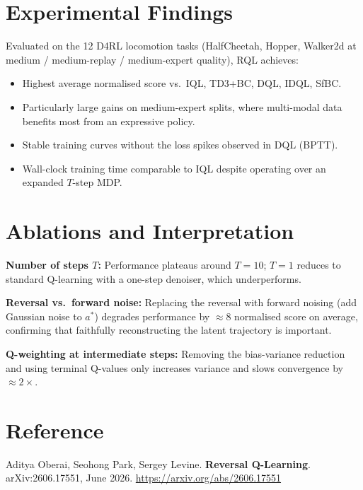 \documentclass[10pt,twocolumn]{article}
\begin{document}
\section{Experimental Findings}

Evaluated on the 12 D4RL locomotion tasks (HalfCheetah, Hopper, Walker2d at
medium / medium-replay / medium-expert quality), RQL achieves:
\begin{itemize}[itemsep=2pt,parsep=0pt]
  \item Highest average normalised score vs.\ IQL, TD3+BC, DQL, IDQL, SfBC.
  \item Particularly large gains on medium-expert splits, where multi-modal
    data benefits most from an expressive policy.
  \item Stable training curves without the loss spikes observed in DQL (BPTT).
  \item Wall-clock training time comparable to IQL despite operating over an
    expanded $T$-step MDP.
\end{itemize}

\section{Ablations and Interpretation}

\textbf{Number of steps $T$:} Performance plateaus around $T=10$; $T=1$
reduces to standard Q-learning with a one-step denoiser, which underperforms.

\textbf{Reversal vs.\ forward noise:} Replacing the reversal with forward
noising (add Gaussian noise to $a^*$) degrades performance by $\approx8$
normalised score on average, confirming that faithfully reconstructing the
latent trajectory is important.

\textbf{Q-weighting at intermediate steps:} Removing the bias-variance
reduction and using terminal Q-values only increases variance and slows
convergence by $\approx2\times$.

\section*{Reference}

Aditya Oberai, Seohong Park, Sergey Levine. \textbf{Reversal Q-Learning}.
arXiv:2606.17551, June 2026.
\url{https://arxiv.org/abs/2606.17551}
\end{document}

